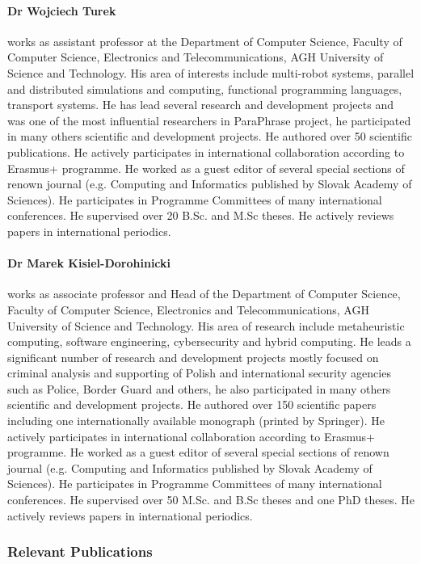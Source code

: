 \documentclass[a4paper,11pt]{article}
\begin{document}
\paragraph{Dr Wojciech Turek} works as assistant professor at the Department of Computer Science, Faculty of Computer Science, Electronics and Telecommunications, AGH University of Science and Technology. His area of interests include multi-robot systems, parallel and distributed simulations and computing, functional programming languages, transport systems. He has lead several research and development projects and was one of the most influential researchers in ParaPhrase project, he participated in many others scientific and development projects. He authored over 50 scientific publications. He actively participates in international collaboration according to Erasmus+ programme. He worked as a guest editor of several special sections of renown journal (e.g. Computing and Informatics published by Slovak Academy of Sciences). He participates in Programme Committees of many international conferences. He supervised over 20 B.Sc. and M.Sc theses. He actively reviews papers in international periodics.

\pagebreak
\paragraph{Dr Marek Kisiel-Dorohinicki} works as associate professor and Head of the Department of Computer Science, Faculty of Computer Science, Electronics and Telecommunications, AGH University of Science and Technology. His area of research include metaheuristic computing, software engineering, cybersecurity and hybrid computing. He leads a significant number of research and development projects mostly focused on criminal analysis and supporting of Polish and international security agencies such as Police, Border Guard and others, he also participated in many others scientific and development projects. He authored over 150 scientific papers including one internationally available monograph (printed by Springer). He actively participates in international collaboration according to Erasmus+ programme. He worked as a guest editor of several special sections of renown journal (e.g. Computing and Informatics published by Slovak Academy of Sciences). He participates in Programme Committees of many international conferences. He supervised over 50 M.Sc. and B.Sc theses and one PhD theses. He actively reviews papers in international periodics.

\subsubsection*{Relevant Publications}
\end{document}
